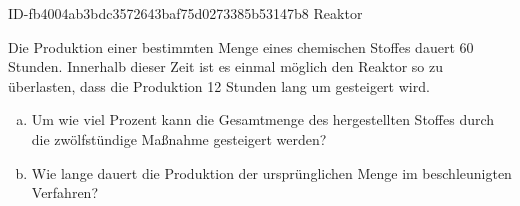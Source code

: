 \begin{exercise}
      {ID-fb4004ab3bdc3572643baf75d0273385b53147b8}
      {Reaktor}
  \ifproblem\problem\par
    Die Produktion einer bestimmten Menge eines chemischen Stoffes dauert 60 Stunden.
    Innerhalb dieser Zeit ist es einmal möglich den Reaktor so zu überlasten, dass
    die Produktion 12 Stunden lang um  gesteigert wird.
    \begin{enumerate}[a)]
      \item Um wie viel Prozent kann die Gesamtmenge des hergestellten Stoffes
            durch die zwölfstündige Maßnahme gesteigert werden?
      \item Wie lange dauert die Produktion der ursprünglichen Menge im
            beschleunigten Verfahren?
    \end{enumerate}
  \fi
\end{exercise}
